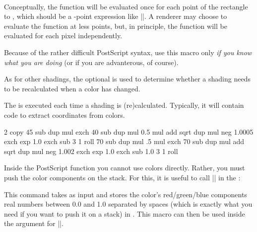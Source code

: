 \begin{command}{\pgfdeclarefunctionalshading{}\\
    }
  Conceptually, the function will be evaluated once for each point of
  the rectangle  to ,
  which should be a \pgfname-point expression like
  |\pgfpoint{100bp}{100bp}|. A renderer may choose to evaluate the
  function at less points, but, in principle, the function will be
  evaluated for each pixel independently. 

  Because of the rather difficult PostScript syntax, use this macro
  only \emph{if you know what you are doing} (or if you are
  advanterous, of course). 

  As for other shadings, the optional  is used to
  determine whether a shading needs to be recalculated when a color
  has changed.

  The  is executed each time a shading is
  (re)calculated. Typically, it will contain code to extract
  coordinates from colors.
  
\begin{codeexample}[]
    {\pgfpointorigin}{\pgfpoint{4cm}{4cm}}{}{
  2 copy
  45 sub dup mul exch
  40 sub dup mul 0.5 mul add sqrt
  dup mul neg 1.0005 exch exp 1.0 exch sub
  3 1 roll
  70 sub dup mul .5 mul exch
  70 sub dup mul add sqrt
  dup mul neg 1.002 exch exp 1.0 exch sub
  1.0 3 1 roll
}
\end{codeexample}

  Inside the PostScript function  you cannot use
  colors directly. Rather, you must push the color components on the
  stack. For this, it is useful to call |\pgfshadecolorrgb| in the
  :
  
\begin{command}{\pgfshadecolortorgb{}}
	This command takes  as input and stores
  the color's red/green/blue components real numbers between 0.0 and
  1.0 separated by spaces (which is exactly what you need if you want
  to push it on a stack) in . This macro can then be used 
  inside the
   argument for |\pgfdeclarefunctionalshading|.



\end{command}
\end{command}
